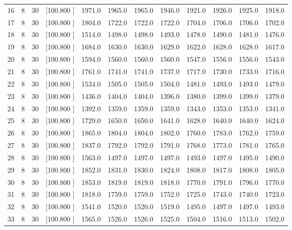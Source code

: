 \documentclass[12pt,a4paper]{article}
\begin{document}
\begin{center}
{\begin{tabular}{r r r r r r r r r r r r}
  16&  8& 30&[100.800   ]&  1971.0&  1965.0&  1965.0&  1946.0&  1921.0&  1926.0&  1925.0&  1918.0\\[-0.02in]
  17&  8& 30&[100.800   ]&  1804.0&  1722.0&  1722.0&  1722.0&  1704.0&  1706.0&  1706.0&  1702.0\\[-0.02in]
  18&  8& 30&[100.800   ]&  1514.0&  1498.0&  1498.0&  1493.0&  1478.0&  1490.0&  1481.0&  1476.0\\[-0.02in]
  19&  8& 30&[100.800   ]&  1684.0&  1630.0&  1630.0&  1629.0&  1622.0&  1628.0&  1628.0&  1617.0\\[-0.02in]
  20&  8& 30&[100.800   ]&  1594.0&  1560.0&  1560.0&  1560.0&  1547.0&  1556.0&  1556.0&  1543.0\\[-0.02in]
  21&  8& 30&[100.800   ]&  1761.0&  1741.0&  1741.0&  1737.0&  1717.0&  1730.0&  1733.0&  1716.0\\[-0.02in]
  22&  8& 30&[100.800   ]&  1534.0&  1505.0&  1505.0&  1504.0&  1481.0&  1493.0&  1493.0&  1479.0\\[-0.02in]
  23&  8& 30&[100.800   ]&  1436.0&  1404.0&  1404.0&  1396.0&  1380.0&  1399.0&  1399.0&  1379.0\\[-0.02in]
  24&  8& 30&[100.800   ]&  1392.0&  1359.0&  1359.0&  1359.0&  1343.0&  1353.0&  1353.0&  1341.0\\[-0.02in]
  25&  8& 30&[100.800   ]&  1729.0&  1650.0&  1650.0&  1641.0&  1628.0&  1640.0&  1640.0&  1624.0\\[-0.02in]
  26&  8& 30&[100.800   ]&  1865.0&  1804.0&  1804.0&  1802.0&  1760.0&  1783.0&  1762.0&  1759.0\\[-0.02in]
  27&  8& 30&[100.800   ]&  1837.0&  1792.0&  1792.0&  1791.0&  1768.0&  1773.0&  1781.0&  1765.0\\[-0.02in]
  28&  8& 30&[100.800   ]&  1563.0&  1497.0&  1497.0&  1497.0&  1493.0&  1497.0&  1495.0&  1490.0\\[-0.02in]
  29&  8& 30&[100.800   ]&  1852.0&  1831.0&  1830.0&  1824.0&  1808.0&  1817.0&  1808.0&  1805.0\\[-0.02in]
  30&  8& 30&[100.800   ]&  1853.0&  1819.0&  1819.0&  1818.0&  1770.0&  1791.0&  1796.0&  1770.0\\[-0.02in]
  31&  8& 30&[100.800   ]&  1818.0&  1759.0&  1759.0&  1752.0&  1725.0&  1743.0&  1740.0&  1723.0\\[-0.02in]
  32&  8& 30&[100.800   ]&  1541.0&  1520.0&  1520.0&  1519.0&  1495.0&  1497.0&  1497.0&  1493.0\\[-0.02in]
  33&  8& 30&[100.800   ]&  1565.0&  1526.0&  1526.0&  1525.0&  1504.0&  1516.0&  1513.0&  1502.0\\[-0.02in]

\end{tabular}}
\end{center}
\end{document}
